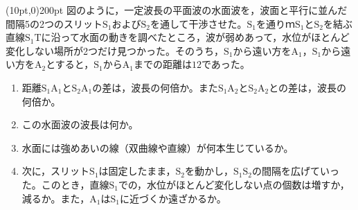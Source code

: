 \hakosyokika
\item
    \begin{mawarikomi}(10pt,0){200pt}{}
        図のように，一定波長の平面波の水面波を，波面と平行に並んだ間隔5の2つのスリット$\mathrm{S_1}$および$\mathrm{S_2}$を通して干渉させた。$\mathrm{S_1}$を通りｍ$\mathrm{S_1}$と$\mathrm{S_2}$を結ぶ直線$\mathrm{S_1T}$に沿って水面の動きを調べたところ，波が弱めあって，水位がほとんど変化しない場所が2つだけ見つかった。そのうち，$\mathrm{S_1}$から遠い方を$\mathrm{A_1}$，$\mathrm{S_1}$から遠い方を$\mathrm{A_2}$とすると，$\mathrm{S_1}$から$\mathrm{A_1}$までの距離は$12$であった。
        \begin{enumerate}
            \item 距離$\mathrm{S_1A_1}$と$\mathrm{S_2A_1}$の差は，波長の何倍か。また$\mathrm{S_1A_2}$と$\mathrm{S_2A_2}$との差は，波長の何倍か。
            \item この水面波の波長は何か。
            \item 水面には強めあいの線（双曲線や直線）が何本生じているか。
            \item 次に，スリット$\mathrm{S_1}$は固定したまま，$\mathrm{S_2}$を動かし，$\mathrm{S_1S_2}$の間隔を広げていった。このとき，直線$\mathrm{S_1}$での，水位がほとんど変化しない点の個数は増すか，減るか。また，$\mathrm{A_1}$は$\mathrm{S_1}$に近づくか遠ざかるか。
        \end{enumerate}
    \end{mawarikomi}